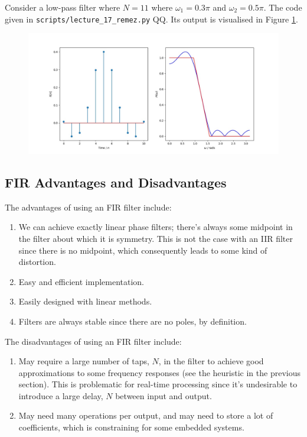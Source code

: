 \begin{exmp}
  Consider a low-pass filter where $N=11$ where $\omega_1 = 0.3\pi$ and
  $\omega_2 = 0.5\pi$. The code given in \texttt{scripts/lecture\_17\_remez.py}
  QQ. Its output is visualised in Figure \ref{fig::lecture_17_remez_example}.
  \begin{figure}[!htb]
    \includegraphics[width=\textwidth]{images/lecture_17_remez_example.JPG}
    \caption{
    }
    \label{fig::lecture_17_remez_example}
  \end{figure}
\end{exmp}

\subsection{FIR Advantages and Disadvantages}
%
The advantages of using an FIR filter include:
%
\begin{enumerate}
\item We can achieve exactly linear phase filters; there's always
  some midpoint in the filter about which it is symmetry. This is
  not the case with an IIR filter since there is no midpoint, which
  consequently leads to some kind of distortion.
\item Easy and efficient implementation.
\item Easily designed with linear methods.
\item Filters are always stable since there are no poles, by definition.
\end{enumerate}
%
The disadvantages of using an FIR filter include:
%
\begin{enumerate}
\item May require a large number of taps, $N$, in the filter to achieve good
  approximations to some frequency responses (see the heuristic in
  the previous section). This is problematic for real-time processing since
  it's undesirable to introduce a large delay, $N$ between input and
  output.
\item May need many operations per output, and may need to store
  a lot of coefficients, which is constraining for some embedded systems.
\end{enumerate}
